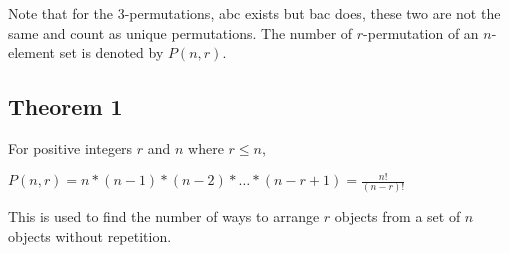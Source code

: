 \documentclass[12pt, letterpaper]{article}
\begin{document}
\noindent Note that for the 3-permutations, abc exists but bac does, these two are not the same and count as unique permutations. The number of \(r\)-permutation of an \(n\)-element set is denoted by \(P(n, r)\).

\subsection*{Theorem 1}

For positive integers \(r\) and \(n\) where \(r \leq n\),
\begin{center}
  \(P(n, r) = n * (n-1) *(n-2) * \dots * (n-r+1) = \frac{n!}{(n-r)!}\) \\
\end{center}

\noindent This is used to find the number of ways to arrange \(r\) objects from a set of \(n\) objects without repetition. \\
\end{document}
